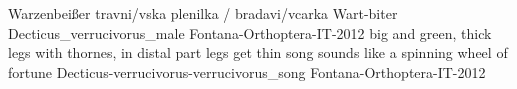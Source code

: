 {Warzenbeißer} %
{travni/v{s}ka plenilka / bradavi/v{c}arka} %
{Wart-biter} %
{Decticus_verrucivorus_male} {Fontana-Orthoptera-IT-2012} %
{} %
{big and green, thick legs with thornes, in distal part legs get thin} %
{song sounds like a spinning wheel of fortune} %
{Decticus-verrucivorus-verrucivorus_song} {Fontana-Orthoptera-IT-2012} %